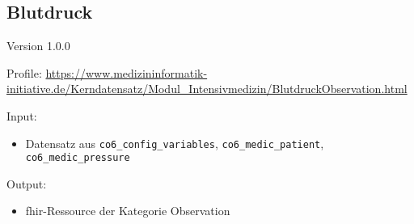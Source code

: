 \subsection{Blutdruck} 
\noindent Version 1.0.0

\noindent Profile: \url{https://www.medizininformatik-initiative.de/Kerndatensatz/Modul_Intensivmedizin/BlutdruckObservation.html}

\noindent Input:
\begin{itemize}
	\item Datensatz aus \texttt{co6\_config\_variables}, \texttt{co6\_medic\_patient}, \\ \texttt{co6\_medic\_pressure}
\end{itemize}
Output:
\begin{itemize}
        \item \ac{fhir}-Ressource der Kategorie \glqq Observation\grqq{}
\end{itemize}
